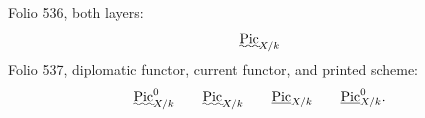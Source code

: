 \documentclass{article}
\begin{document}
\noindent Folio 536, both layers:
\[
\text{\uwave{Pic}}_{X/k}
\]
Folio 537, diplomatic functor, current functor, and printed scheme:
\[
\text{\uwave{Pic}}^0_{X/k}
\qquad
\text{\uwave{Pic}}_{X/k}
\qquad
\underline{\operatorname{Pic}}_{X/k}
\qquad
\underline{\operatorname{Pic}}^0_{X/k}.
\]
\end{document}

